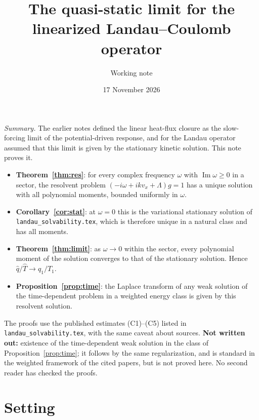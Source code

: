 \documentclass[11pt]{article}
\title{The quasi-static limit for the linearized Landau--Coulomb operator}
\author{Working note}
\date{17 November 2026}
\renewcommand{\Im}{\operatorname{Im}}
\theoremstyle{remark}
\begin{document}
\sloppy
\maketitle

\noindent\emph{Summary.} The earlier notes defined the linear heat-flux
closure as the slow-forcing limit of the potential-driven response, and for
the Landau operator assumed that this limit is given by the stationary
kinetic solution. This note proves it.
\begin{itemize}
  \item \textbf{Theorem~\ref{thm:res}}: for every complex frequency $\omega$
    with $\Im\omega\ge0$ in a sector, the resolvent problem
    $(-i\omega+ikv_x+\Lambda)g=1$ has a unique solution with all polynomial
    moments, bounded uniformly in $\omega$.
  \item \textbf{Corollary~\ref{cor:stat}}: at $\omega=0$ this is the
    variational stationary solution of \texttt{landau\_solvability.tex},
    which is therefore unique in a natural class and has all moments.
  \item \textbf{Theorem~\ref{thm:limit}}: as $\omega\to0$ within the sector,
    every polynomial moment of the solution converges to that of the
    stationary solution. Hence $\hat q/\hat T\to q_1/T_1$.
  \item \textbf{Proposition~\ref{prop:time}}: the Laplace transform of any
    weak solution of the time-dependent problem in a weighted energy class
    is given by this resolvent solution.
\end{itemize}
The proofs use the published estimates (C1)--(C5) listed in
\texttt{landau\_solvability.tex}, with the same caveat about sources.
\textbf{Not written out:} existence of the time-dependent weak solution in
the class of Proposition~\ref{prop:time}; it follows by the same
regularization, and is standard in the weighted framework of the cited
papers, but is not proved here. No second reader has checked the proofs.

\section{Setting}
\end{document}

